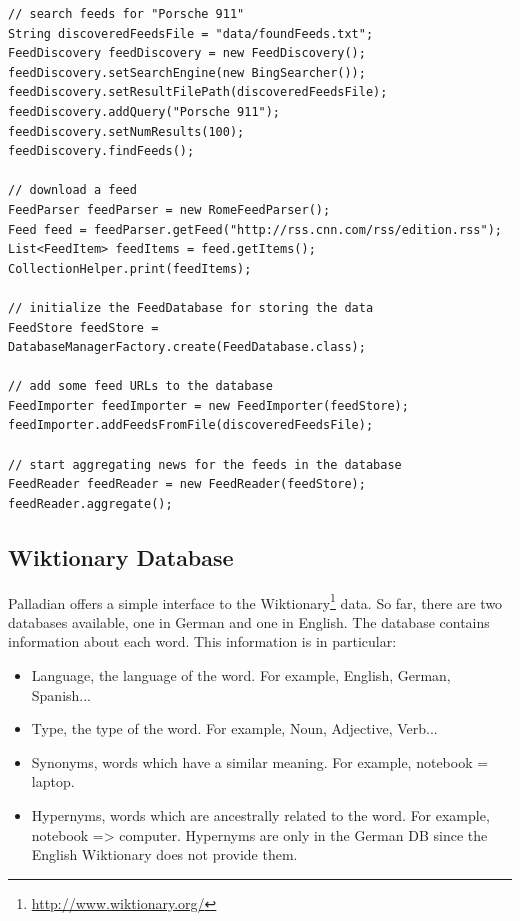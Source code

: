\begin{codelisting}
\begin{lstlisting}[caption=Using the \texttt{feeds} package.,frame=tb,label=listing:feeds]
// search feeds for "Porsche 911"
String discoveredFeedsFile = "data/foundFeeds.txt";
FeedDiscovery feedDiscovery = new FeedDiscovery();
feedDiscovery.setSearchEngine(new BingSearcher());
feedDiscovery.setResultFilePath(discoveredFeedsFile);
feedDiscovery.addQuery("Porsche 911");
feedDiscovery.setNumResults(100);
feedDiscovery.findFeeds();

// download a feed
FeedParser feedParser = new RomeFeedParser();
Feed feed = feedParser.getFeed("http://rss.cnn.com/rss/edition.rss");
List<FeedItem> feedItems = feed.getItems();
CollectionHelper.print(feedItems);

// initialize the FeedDatabase for storing the data
FeedStore feedStore = DatabaseManagerFactory.create(FeedDatabase.class);

// add some feed URLs to the database
FeedImporter feedImporter = new FeedImporter(feedStore);
feedImporter.addFeedsFromFile(discoveredFeedsFile);

// start aggregating news for the feeds in the database
FeedReader feedReader = new FeedReader(feedStore);
feedReader.aggregate();
\end{lstlisting}
\end{codelisting}

\subsection{Wiktionary Database}\label{sec:wiktionaryDB}
Palladian offers a simple interface to the Wiktionary\footnote{\url{http://www.wiktionary.org/}} data. So far, there are two databases available, one in German and one in English. The database contains information about each word. This information is in particular:
\begin{itemize}
\item Language, the language of the word. For example, English, German, Spanish...
\item Type, the type of the word. For example, Noun, Adjective, Verb...
\item Synonyms, words which have a similar meaning. For example, notebook = laptop.
\item Hypernyms, words which are ancestrally related to the word. For example, notebook => computer. Hypernyms are only in the German DB since the English Wiktionary does not provide them.
\end{itemize}

